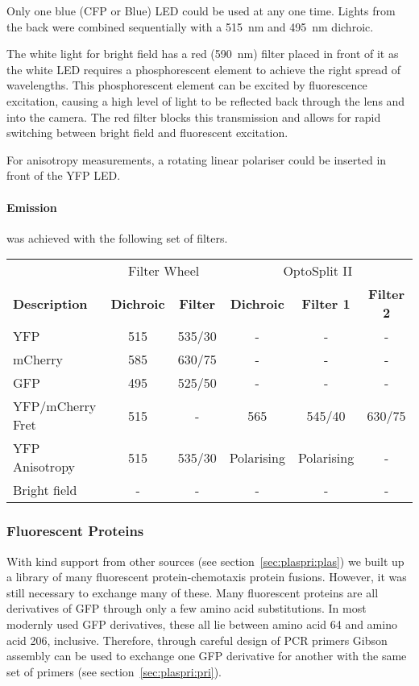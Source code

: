 \documentclass[../main.tex]{subfiles}
\begin{document}
Only one blue (CFP or Blue) LED could be used at any one time. Lights from the back were combined sequentially with a \SI{515}{\nano\meter} and \SI{495}{\nano\meter} dichroic.

The white light for bright field has a red (\SI{590}{\nano\meter}) filter placed in front of it as the white LED requires a phosphorescent element to achieve the right spread of wavelengths. This phosphorescent element can be excited by fluorescence excitation, causing a high level of light to be reflected back through the lens and into the camera. The red filter blocks this transmission and allows for rapid switching between bright field and fluorescent excitation.

For anisotropy measurements, a rotating linear polariser could be inserted in front of the YFP LED.

\paragraph{Emission} was achieved with the following set of filters.
\begin{center}
\begin{tabular}{l|c|c|c|c|c}
&	\multicolumn{2}{c|}{Filter Wheel}	&	\multicolumn{3}{c}{OptoSplit II}	\\
\textbf{Description}	&	\textbf{Dichroic}	&	\textbf{Filter}		& \textbf{Dichroic}	&	\textbf{Filter 1}	&	\textbf{Filter 2}	\\\hline
YFP		&	515		&	535/30	&	-	&	-	&	-	\\
mCherry	&	585		&	630/75	&	-	&	-	&	-	\\
GFP		&	495		&	525/50	&	-	&	-	&	-	\\
YFP/mCherry Fret	&	515	&	-	&	565	&	545/40	&	630/75	\\
YFP Anisotropy	&	515	&	535/30	&	Polarising	&	Polarising	&	-	\\
Bright field		&	-	&	-	&	-	&	-	&	-	
\end{tabular}
\end{center}

\subsubsection{Fluorescent Proteins}

With kind support from other sources (see section~\ref{sec:plaspri:plas}) we built up a library of many fluorescent protein-chemotaxis protein fusions. However, it was still necessary to exchange many of these. Many fluorescent proteins are all derivatives of GFP through only a few amino acid substitutions\cite{tsien98}. In most modernly used GFP derivatives, these all lie between amino acid 64 and amino acid 206, inclusive. Therefore, through careful design of PCR primers Gibson assembly can be used to exchange one GFP derivative for another with the same set of primers (see section~\ref{sec:plaspri:pri}).
\end{document}
